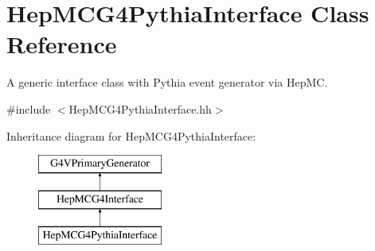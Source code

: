 \hypertarget{class_hep_m_c_g4_pythia_interface}{}\section{Hep\+M\+C\+G4\+Pythia\+Interface Class Reference}
\label{class_hep_m_c_g4_pythia_interface}


A generic interface class with Pythia event generator via Hep\+M\+C.  




{\ttfamily \#include $<$Hep\+M\+C\+G4\+Pythia\+Interface.\+hh$>$}

Inheritance diagram for Hep\+M\+C\+G4\+Pythia\+Interface\+:\begin{figure}[H]
\begin{center}
\leavevmode
\includegraphics[height=3.000000cm]{class_hep_m_c_g4_pythia_interface}
\end{center}
\end{figure}
